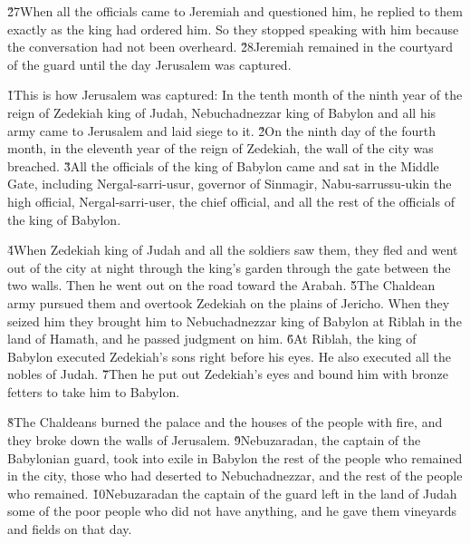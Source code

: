 \v{27}When all the officials came to Jeremiah and questioned him, he replied to them exactly as the king had ordered him. So they stopped speaking with him because the conversation had not been overheard. \v{28}Jeremiah remained in the courtyard of the guard until the day Jerusalem was captured.

\v{1}This is how Jerusalem was captured: In the tenth month of the ninth year of the reign of Zedekiah king of Judah, Nebuchadnezzar king of Babylon and all his army came to Jerusalem and laid siege to it. \v{2}On the ninth day of the fourth month, in the eleventh year of the reign of Zedekiah, the wall of the city was breached. \v{3}All the officials of the king of Babylon came and sat in the Middle Gate, including Nergal-sarri-usur, governor of Sinmagir, Nabu-sarrussu-ukin the high official, Nergal-sarri-user, the chief official, and all the rest of the officials of the king of Babylon.

\v{4}When Zedekiah king of Judah and all the soldiers saw them, they fled and went out of the city at night through the king's garden through the gate between the two walls. Then he went out on the road toward the Arabah. \v{5}The Chaldean army pursued them and overtook Zedekiah on the plains of Jericho. When they seized him they brought him to Nebuchadnezzar king of Babylon at Riblah in the land of Hamath, and he passed judgment on him. \v{6}At Riblah, the king of Babylon executed Zedekiah's sons right before his eyes. He also executed all the nobles of Judah. \v{7}Then he put out Zedekiah's eyes and bound him with bronze fetters to take him to Babylon.

\v{8}The Chaldeans burned the palace and the houses of the people with fire, and they broke down the walls of Jerusalem. \v{9}Nebuzaradan, the captain of the Babylonian guard, took into exile in Babylon the rest of the people who remained in the city, those who had deserted to Nebuchadnezzar, and the rest of the people who remained. \v{10}Nebuzaradan the captain of the guard left in the land of Judah some of the poor people who did not have anything, and he gave them vineyards and fields on that day.

